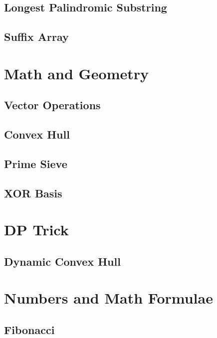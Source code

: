 \documentclass[twocolumn]{article}
\begin{document}
\subsection{Longest Palindromic Substring}


\subsection{Suffix Array}


\section{Math and Geometry}

\subsection{Vector Operations}


\subsection{Convex Hull}


\subsection{Prime Sieve}


\subsection{XOR Basis}


\section{DP Trick}

\subsection{Dynamic Convex Hull}


\section{Numbers and Math Formulae}

\subsection{Fibonacci}
\end{document}
